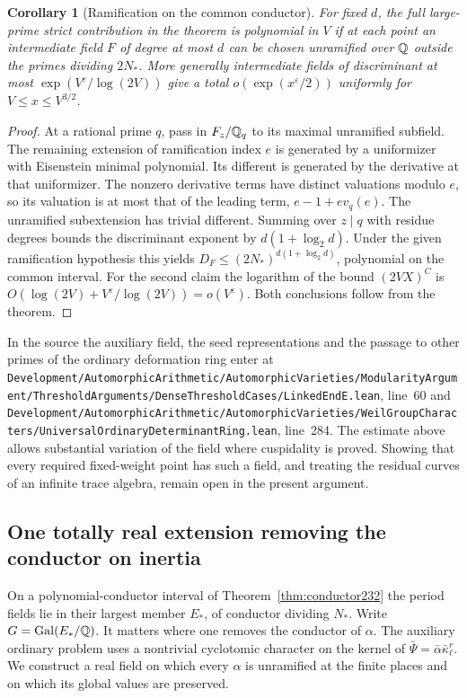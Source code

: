 \documentclass[a4paper,11pt]{article}
\newtheorem{corollary}[proposition]{Corollary}
\theoremstyle{definition}
\theoremstyle{remark}
\newcommand{\srcloc}[2]{{\small\nolinkurl{#1.lean}}, line~#2}
\numberwithin{equation}{section}
\begin{document}
\begin{corollary}[Ramification on the common conductor]\leavevmode
\label{cor:cmram403}
For fixed \(d\), the full large-prime strict contribution in
the theorem is polynomial in \(V\) if at each point an
intermediate field \(F\) of degree at most \(d\) can be chosen
unramified over \(\mathbb Q\) outside the primes dividing \(2N_*\).
More generally intermediate fields of discriminant at most
\(\exp(V^\varepsilon/\log(2V))\) give a total
\(o(\exp(x^\varepsilon/2))\) uniformly for
\(V\le x\le V^{3/2}\).
\end{corollary}
\begin{proof}
At a rational prime \(q\), pass in \(F_z/\mathbb Q_q\) to its
maximal unramified subfield. The remaining extension of
ramification index \(e\) is generated by a uniformizer with
Eisenstein minimal polynomial. Its different is generated by
the derivative at that uniformizer. The nonzero derivative
terms have distinct valuations modulo \(e\), so its valuation
is at most that of the leading term, \(e-1+e v_q(e)\).
The unramified subextension has trivial different. Summing
over \(z\mid q\) with residue degrees bounds the discriminant
exponent by \(d(1+\log_2 d)\). Under the given ramification
hypothesis this yields \(D_F\le(2N_*)^{d(1+\log_2 d)}\),
polynomial on the common interval. For the second claim the
logarithm of the bound \((2VX)^C\) is
\(O(\log(2V)+V^\varepsilon/\log(2V))=o(V^\varepsilon)\).
Both conclusions follow from the theorem.
\end{proof}

In the source the auxiliary field, the seed representations
and the passage to other primes of the ordinary deformation
ring enter at
\srcloc{Development/AutomorphicArithmetic/AutomorphicVarieties/ModularityArgument/ThresholdArguments/DenseThresholdCases/LinkedEndE}{60}
and
\srcloc{Development/AutomorphicArithmetic/AutomorphicVarieties/WeilGroupCharacters/UniversalOrdinaryDeterminantRing}{284}.
The estimate above allows substantial variation of the field
where cuspidality is proved. Showing that every required
fixed-weight point has such a field, and treating the residual
curves of an infinite trace algebra, remain open in the present
argument.


\subsection{One totally real extension removing the conductor on inertia}
\label{sec:realram404}

On a polynomial-conductor interval of Theorem~\ref{thm:conductor232}
the period fields lie in their largest member \(E_*\), of conductor
dividing \(N_*\). Write \(G=\operatorname{Gal}(E_*/\mathbb Q)\). It matters
where one removes the conductor of \(\alpha\). The auxiliary
ordinary problem uses a nontrivial cyclotomic character on the
kernel of \(\bar\Psi=\bar\alpha\bar\kappa_\ell^r\). We construct
a real field on which every \(\alpha\) is unramified at the finite
places and on which its global values are preserved.
\end{document}
